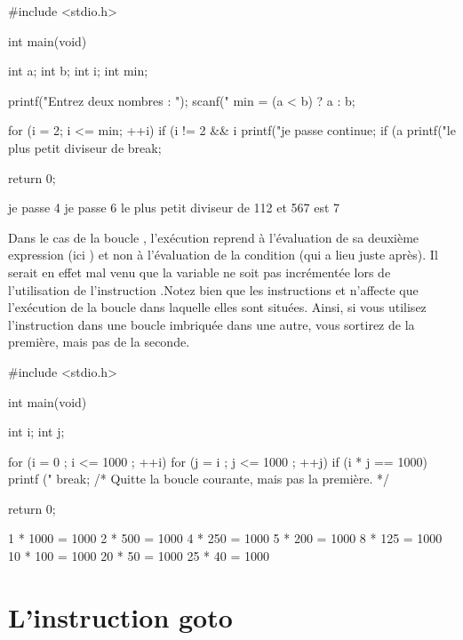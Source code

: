 \begin{C}
  #include <stdio.h>


  int main(void) { int a; int b; int i; int min;

    printf("Entrez deux nombres : "); scanf("%
    min = (a < b) ? a : b;

    for (i = 2; i <= min; ++i) { if (i != 2 && i %
      { printf("je passe %
        continue; } if (a %
      { printf("le plus petit diviseur
        de %
        break; } }

    return 0; }
\end{C}

\begin{C}
  je passe 4 je passe 6 le plus petit diviseur de 112 et 567 est 7
\end{C}

\begin{infobox}
  Dans le cas de la boucle , l'exécution reprend à
  l'évaluation de sa deuxième expression (ici ) et non à
  l'évaluation de la condition (qui a lieu juste après). Il serait en
  effet mal venu que la variable  ne soit pas incrémentée
  lors de l'utilisation de l'instruction .Notez bien
  que les instructions  et  n'affecte que
  l'exécution de la boucle dans laquelle elles sont situées. Ainsi, si
  vous utilisez l'instruction  dans une boucle imbriquée
  dans une autre, vous sortirez de la première, mais pas de la
  seconde.
\end{infobox}

\begin{C}
  #include <stdio.h>


  int main(void) { int i; int j;

    for (i = 0 ; i <= 1000 ; ++i) { for (j = i ; j <= 1000 ; ++j) { if
        (i * j == 1000) { printf ("%
          break; /* Quitte la boucle courante, mais pas la
          première. */ } } }

    return 0; }
\end{C}

\begin{C}
  1 * 1000 = 1000 2 * 500 = 1000 4 * 250 = 1000 5 * 200 = 1000 8 * 125
  = 1000 10 * 100 = 1000 20 * 50 = 1000 25 * 40 = 1000
\end{C}



\section{L'instruction goto}
\label{Linstruction-goto}

